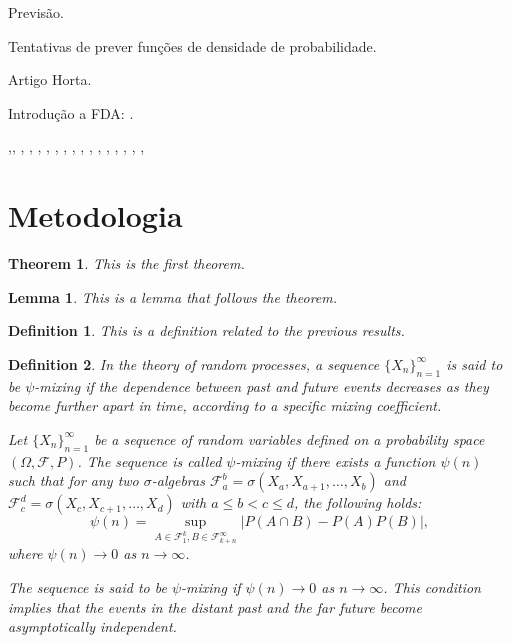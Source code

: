 \documentclass[article]{abntex2}
\newtheorem{theorem}{Theorem} %
\newtheorem{lemma}{Lemma}     %
\newtheorem{definition}{Definition} %
\begin{document}
Previsão.

Tentativas de prever funções de densidade de probabilidade.

Artigo Horta.

Introdução a FDA: .

,, , , , , , , , , , , , , , , , 

\section{Metodologia}
\begin{theorem}
This is the first theorem.
\end{theorem}

\begin{lemma}
This is a lemma that follows the theorem.
\end{lemma}

\begin{definition}
This is a definition related to the previous results.
\end{definition}

\begin{definition}
In the theory of random processes, a sequence $\{ X_n \}_{n=1}^{\infty}$ is said to be $\psi$-mixing if the dependence between past and future events decreases as they become further apart in time, according to a specific mixing coefficient.

Let $\{ X_n \}_{n=1}^{\infty}$ be a sequence of random variables defined on a probability space $(\Omega, \mathcal{F}, P)$. The sequence is called \emph{$\psi$-mixing} if there exists a function $\psi(n)$ such that for any two $\sigma$-algebras $\mathcal{F}_a^b = \sigma(X_a, X_{a+1}, \ldots, X_b)$ and $\mathcal{F}_c^d = \sigma(X_c, X_{c+1}, \ldots, X_d)$ with $a \leq b < c \leq d$, the following holds:
\[
\psi(n) = \sup_{A \in \mathcal{F}_1^k, B \in \mathcal{F}_{k+n}^\infty} |P(A \cap B) - P(A)P(B)|,
\]
where $\psi(n) \to 0$ as $n \to \infty$.

The sequence is said to be $\psi$-mixing if $\psi(n) \to 0$ as $n \to \infty$. This condition implies that the events in the distant past and the far future become asymptotically independent.
\end{definition}
\end{document}
